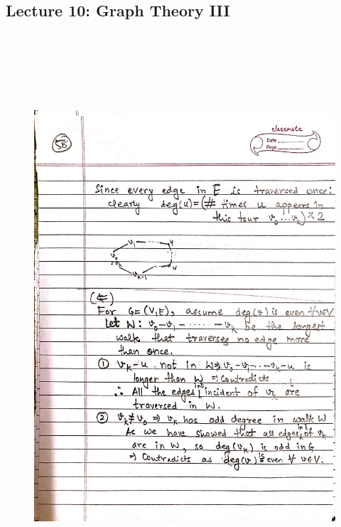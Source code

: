 \newpage
{\color{black} \subsection*{Lecture 10: Graph Theory III}}
\begin{figure}[H]
    \centering
    \includegraphics[width=16cm, height=21cm]{"./MIT-6.042J/MIT-6042J-058"}
\end{figure}

